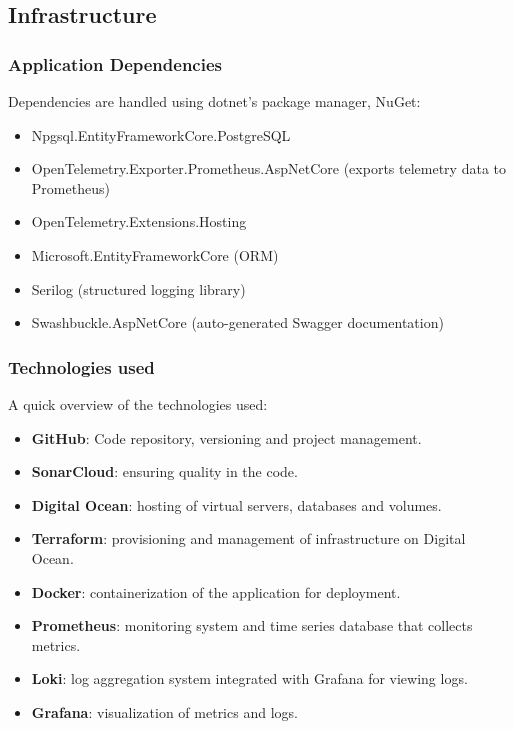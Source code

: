 \subsection{Infrastructure}
\subsubsection{Application Dependencies}
Dependencies are handled using dotnet's package manager, NuGet:
\begin{itemize}
    \item Npgsql.EntityFrameworkCore.PostgreSQL 
    \item OpenTelemetry.Exporter.Prometheus.AspNetCore (exports telemetry data to Prometheus)
    \item OpenTelemetry.Extensions.Hosting
    \item Microsoft.EntityFrameworkCore (ORM)
    \item Serilog (structured logging library)
    \item Swashbuckle.AspNetCore (auto-generated Swagger documentation)
\end{itemize}

\subsubsection{Technologies used}
A quick overview of the technologies used:
\begin{itemize}
    \item \textbf{GitHub}: Code repository, versioning and project management.
    \item \textbf{SonarCloud}: ensuring quality in the code.
    \item \textbf{Digital Ocean}: hosting of virtual servers, databases and volumes.
    \item \textbf{Terraform}: provisioning and management of infrastructure on Digital Ocean.
    \item \textbf{Docker}: containerization of the application for deployment.
    \item \textbf{Prometheus}: monitoring system and time series database that collects metrics.
    \item \textbf{Loki}: log aggregation system integrated with Grafana for viewing logs.
    \item \textbf{Grafana}: visualization of metrics and logs.
\end{itemize} 

